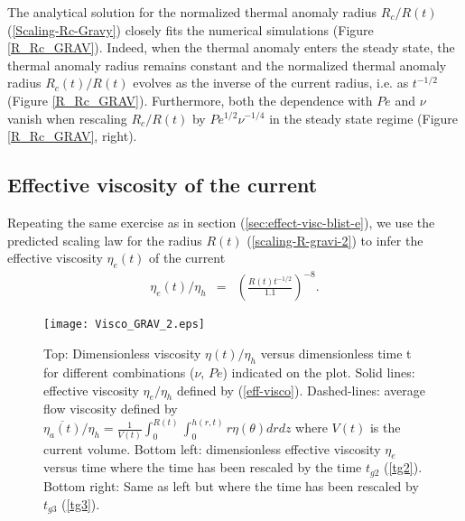 The  analytical solution  for  the normalized  thermal anomaly  radius
$R_c/R(t)$   (\ref{Scaling-Rc-Gravy})  closely   fits  the   numerical
simulations  (Figure  \ref{R_Rc_GRAV}).    Indeed,  when  the  thermal
anomaly enters  the steady state,  the thermal anomaly  radius remains
constant  and  the  normalized thermal  anomaly  radius  $R_c(t)/R(t)$
evolves  as the  inverse of  the current  radius, i.e.   as $t^{-1/2}$
(Figure \ref{R_Rc_GRAV}).  Furthermore, both  the dependence with $Pe$
and $\nu$  vanish when rescaling $R_c/R(t)$  by $Pe^{1/2}\nu^{-1/4}$
in the steady state regime (Figure \ref{R_Rc_GRAV}, right).

\subsection{Effective viscosity of the current}
\label{sec:effect-visc-blist-g}

Repeating      the     same      exercise   as      in     section
(\ref{sec:effect-visc-blist-e}), we use the  predicted scaling law for
the  radius $R(t)$  (\ref{scaling-R-gravi-2}) to  infer the  effective
viscosity $\eta_e(t)$ of the current
\begin{eqnarray}
  \eta_e(t)/\eta_h&=& \left(\frac{R(t)t^{-1/2}}{1.1}\right)^{-8}\label{eff-visco-grav}.
\end{eqnarray}


\begin{figure}
  \begin{center}
    \graphicspath{ {/Users/thorey/Documents/These/Projet/Refroidissement/Skin_Model/Figure/JFM_V13/} }
    \texttt{[image: Visco\_GRAV\_2.eps]}
    \caption{Top:  Dimensionless   viscosity  $\eta(t)/\eta_h$  versus
      dimensionless time  t for  different combinations  ($\nu$, $Pe$)
      indicated  on  the  plot.    Solid  lines:  effective  viscosity
      $\eta_e/\eta_h$  defined  by  (\ref{eff-visco}).   Dashed-lines:
      average         flow         viscosity        defined         by
      $\overline{\eta_a(t)}/\eta_h                                   =
      \frac{1}{V(t)}\int_0^{R(t)}\int_0^{h(r,t)} r \eta(\theta) dr dz$
      where $V(t)$ is the  current volume.  Bottom left: dimensionless
      effective viscosity $\eta_e$ versus time where the time has been
      rescaled by  the time $t_{g2}$ (\ref{tg2}).   Bottom right: Same
      as  left  but where  the  time  has  been rescaled  by  $t_{g3}$
      (\ref{tg3}). }
    \label{Visco_GRAV_2}
  \end{center}
\end{figure}

